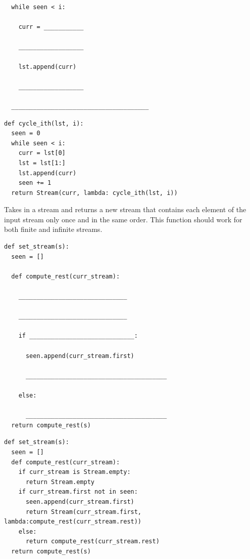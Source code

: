 \documentclass{exam}
\begin{document}
\begin{questions}
\begin{lstlisting}
  while seen < i:

    curr = ___________

    __________________

    lst.append(curr)

    __________________

  ______________________________________
\end{lstlisting}
\begin{solution}
\begin{lstlisting}
def cycle_ith(lst, i):
  seen = 0
  while seen < i:
    curr = lst[0]
    lst = lst[1:]
    lst.append(curr)
    seen += 1
  return Stream(curr, lambda: cycle_ith(lst, i))
\end{lstlisting}
\end{solution}

\item Takes in a stream and returns a new stream that contains each element of the input stream only once and in the same order. This function should work for both finite and infinite streams.
\newline
\begin{lstlisting}
def set_stream(s):
  seen = []

  def compute_rest(curr_stream):

    ______________________________

    ______________________________

    if _____________________________:

      seen.append(curr_stream.first)

      _______________________________________

    else:

      _______________________________________
  return compute_rest(s)
\end{lstlisting}
\begin{solution}
\begin{lstlisting}
def set_stream(s):
  seen = []
  def compute_rest(curr_stream):
    if curr_stream is Stream.empty:
      return Stream.empty
    if curr_stream.first not in seen:
      seen.append(curr_stream.first)
      return Stream(curr_stream.first, lambda:compute_rest(curr_stream.rest))
    else:
      return compute_rest(curr_stream.rest)
  return compute_rest(s)
\end{lstlisting}
\end{solution}
\end{questions}

\end{document}
